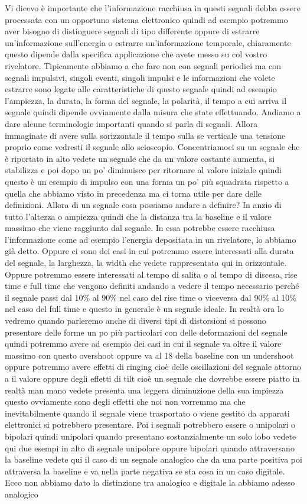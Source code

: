 Vi dicevo è importante che l'informazione racchiusa in questi segnali debba essere processata con un opportuno sistema elettronico quindi ad esempio potremmo aver bisogno di distinguere segnali di tipo differente oppure di estrarre un'informazione sull'energia o estrarre un'informazione temporale, chiaramente questo dipende dalla specifica applicazione che avete messo su col vostro rivelatore. Tipicamente abbiamo a che fare non con segnali periodici ma con segnali impulsivi, singoli eventi, singoli impulsi e le informazioni che volete estrarre sono legate alle caratteristiche di questo segnale quindi ad esempio l'ampiezza, la durata, la forma del segnale, la polarità, il tempo a cui arriva il segnale quindi dipende ovviamente dalla misura che state effettuando. Andiamo a dare alcune terminologie importanti quando si parla di segnali. Allora immaginate di avere sulla sorizzontale il tempo sulla se verticale una tensione proprio come vedresti il segnale allo scioscopio. Concentriamoci su un segnale che è riportato in alto vedete un segnale che da un valore costante aumenta, si stabilizza e poi dopo un po' diminuisce per ritornare al valore iniziale quindi questo è un esempio di impulso con una forma un po' più squadrata rispetto a quella che abbiamo visto in precedenza ma ci torna utile per dare delle definizioni. Allora di un segnale cosa possiamo andare a definire? In anzio di tutto l'altezza o ampiezza quindi che la distanza tra la baseline e il valore massimo che viene raggiunto dal segnale. In essa potrebbe essere racchiusa l'informazione come ad esempio l'energia depositata in un rivelatore, lo abbiamo già detto. Oppure ci sono dei casi in cui potremmo essere interessati alla durata del segnale, la larghezza, la width che vedete rappresentata qui in orizzontale. Oppure potremmo essere interessati al tempo di salita o al tempo di discesa, rise time e full time che vengono definiti andando a vedere il tempo necessario perché il segnale passi dal 10\% al 90\% nel caso del rise time o viceversa dal 90\% al 10\% nel caso del full time e questo in generale è un segnale ideale. In realtà ora lo vedremo quando parleremo anche di diversi tipi di distorsioni si possono presentare delle forme un po più particolari con delle deformazioni del segnale quindi potremmo avere ad esempio dei casi in cui il segnale va oltre il valore massimo con questo overshoot oppure va al 18 della baseline con un undershoot oppure potremmo avere effetti di ringing cioè delle oscillazioni del segnale attorno a il valore oppure degli effetti di tilt cioè un segnale che dovrebbe essere piatto in realtà man mano vedete presenta una leggera diminuzione della sua impiezza questo ovviamente sono degli effetti che noi non vorremmo ma che inevitabilmente quando il segnale viene trasportato o viene gestito da apparati elettronici si potrebbero presentare. Poi i segnali potrebbero essere o unipolari o bipolari quindi unipolari quando presentano sostanzialmente un solo lobo vedete qui due esempi in alto di segnale unipolare oppure bipolari quando attraversano la baseline vedete qui il caso di un segnale analogico che da una parte positiva poi attraversa la baseline e va nella parte negativa se sta cosa in un caso digitale. Ecco non abbiamo dato la distinzione tra analogico e digitale la abbiamo adesso analogico 